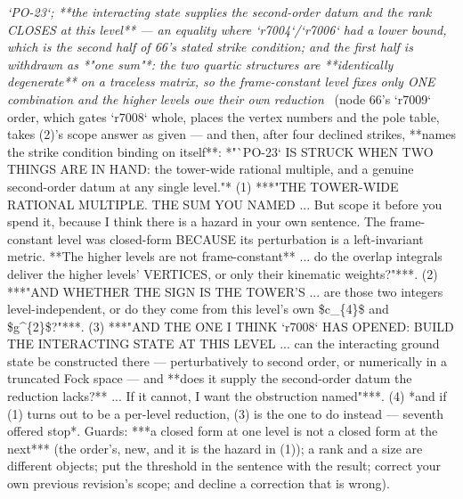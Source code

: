 \begin{description}
\textit{`PO-23`; **the interacting state supplies the second-order datum and the rank CLOSES at this level** --- an equality where `r7004`/`r7006` had a lower bound, which is the second half of 66's stated strike condition;  and the first half is withdrawn as *"one sum"*: the two quartic structures are **identically degenerate** on a traceless matrix, so the frame-constant level fixes only ONE combination and the higher levels owe their own reduction} \ (node 66's `r7009` order, which gates `r7008` whole, places the vertex numbers and the pole table, takes (2)'s scope answer as given --- and then, after four declined strikes, **names the strike condition binding on itself**: *"`PO-23` IS STRUCK WHEN TWO THINGS ARE IN HAND: the tower-wide rational multiple, and a genuine second-order datum at any single level."* (1) ***"THE TOWER-WIDE RATIONAL MULTIPLE.  THE SUM YOU NAMED ...  But scope it before you spend it, because I think there is a hazard in your own sentence.  The frame-constant level was closed-form BECAUSE its perturbation is a left-invariant metric.  **The higher levels are not frame-constant** ... do the overlap integrals deliver the higher levels' VERTICES, or only their kinematic weights?"***. (2) ***"AND WHETHER THE SIGN IS THE TOWER'S ... are those two integers level-independent, or do they come from this level's own \$c\_\{4\}\$ and \$g\textasciicircum{}\{2\}\$?"***. (3) ***"AND THE ONE I THINK `r7008` HAS OPENED: BUILD THE INTERACTING STATE AT THIS LEVEL ... can the interacting ground state be constructed there --- perturbatively to second order, or numerically in a truncated Fock space --- and **does it supply the second-order datum the reduction lacks?** ... If it cannot, I want the obstruction named"***. (4) *and if (1) turns out to be a per-level reduction, (3) is the one to do instead --- seventh offered stop*.  Guards: ***a closed form at one level is not a closed form at the next*** (the order's, new, and it is the hazard in (1)); a rank and a size are different objects; put the threshold in the sentence with the result; correct your own previous revision's scope; and decline a correction that is wrong). 

\end{description}
